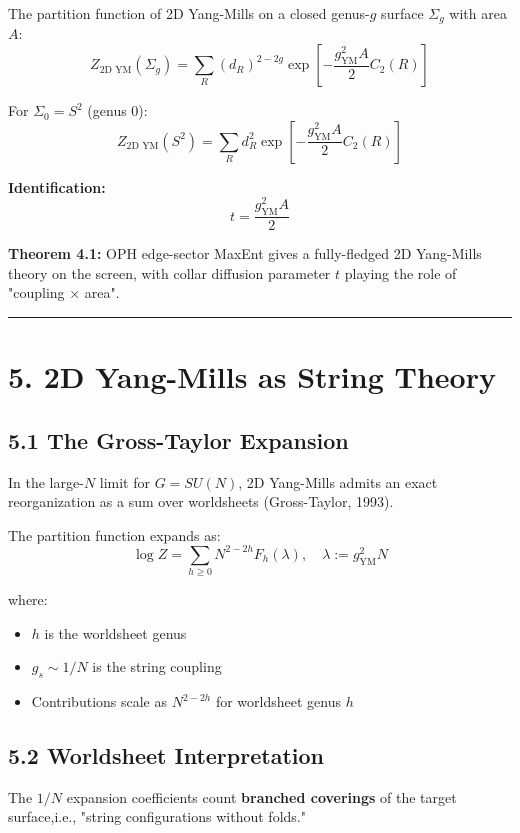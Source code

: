 The partition function of 2D Yang-Mills on a closed genus-\(g\) surface \(\Sigma_g\) with area \(A\): \[Z_{\text{2D YM}}(\Sigma_g) = \sum_R (d_R)^{2-2g} \exp\left[-\frac{g_{\text{YM}}^2 A}{2} C_2(R)\right]\]

For \(\Sigma_0 = S^2\) (genus 0): \[Z_{\text{2D YM}}(S^2) = \sum_R d_R^2 \exp\left[-\frac{g_{\text{YM}}^2 A}{2} C_2(R)\right]\]

\textbf{Identification:} \[t = \frac{g_{\text{YM}}^2 A}{2}\]

\textbf{Theorem 4.1:} OPH edge-sector MaxEnt gives a fully-fledged 2D Yang-Mills theory on the screen, with collar diffusion parameter \(t\) playing the role of "coupling × area".

\begin{center}\rule{0.5\linewidth}{0.5pt}\end{center}

\section{5. 2D Yang-Mills as String Theory}\label{5-2d-yang-mills-as-string-theory}

\subsection{5.1 The Gross-Taylor Expansion}\label{51-the-gross-taylor-expansion}

In the large-\(N\) limit for \(G = SU(N)\), 2D Yang-Mills admits an exact reorganization as a sum over worldsheets (Gross-Taylor, 1993).

The partition function expands as: \[\log Z = \sum_{h \geq 0} N^{2-2h} F_h(\lambda), \quad \lambda := g_{\text{YM}}^2 N\]

where:

\begin{itemize}
\tightlist
\item
  \(h\) is the worldsheet genus
\item
  \(g_s \sim 1/N\) is the string coupling
\item
  Contributions scale as \(N^{2-2h}\) for worldsheet genus \(h\)
\end{itemize}

\subsection{5.2 Worldsheet Interpretation}\label{52-worldsheet-interpretation}

The \(1/N\) expansion coefficients count \textbf{branched coverings} of the target surface,i.e., "string configurations without folds."

